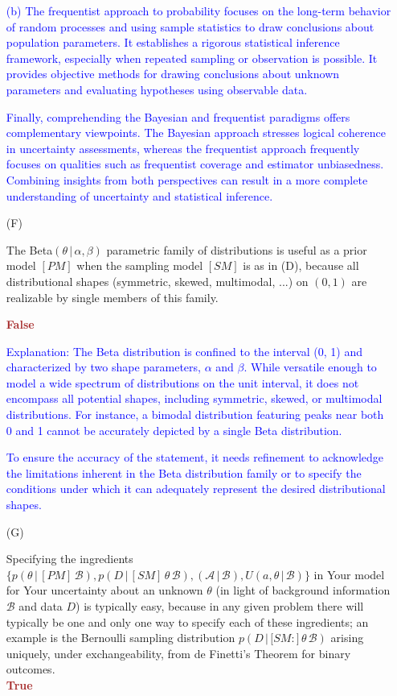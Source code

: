\documentclass[12pt]{article}
\newcommand{\given}{\, | \,}
\begin{document}
\begin{itemize}
\textcolor{blue}{(b) The frequentist approach to probability focuses on the long-term behavior of random processes and using sample statistics to draw conclusions about population parameters. It establishes a rigorous statistical inference framework, especially when repeated sampling or observation is possible. It provides objective methods for drawing conclusions about unknown parameters and evaluating hypotheses using observable data.}

\textcolor{blue}{Finally, comprehending the Bayesian and frequentist paradigms offers complementary viewpoints. The Bayesian approach stresses logical coherence in uncertainty assessments, whereas the frequentist approach frequently focuses on qualities such as frequentist coverage and estimator unbiasedness. Combining insights from both perspectives can result in a more complete understanding of uncertainty and statistical inference.}




\item[(F)]

The Beta$( \theta \given \alpha, \beta )$ parametric family of distributions is
useful as a prior model $[ PM ]$ when the sampling model $[ SM ]$ is as in
(D), because all distributional shapes (symmetric, skewed, multimodal, ...)
on $( 0, 1 )$ are realizable by single members of this family.

\textcolor{brown}{\textbf{False}}

\textcolor{blue}{Explanation:}
\textcolor{blue}{The Beta distribution is confined to the interval (0, 1) and characterized by two shape parameters, $\alpha$ and $\beta$. While versatile enough to model a wide spectrum of distributions on the unit interval, it does not encompass all potential shapes, including symmetric, skewed, or multimodal distributions. For instance, a bimodal distribution featuring peaks near both 0 and 1 cannot be accurately depicted by a single Beta distribution.}

\textcolor{blue}{To ensure the accuracy of the statement, it needs refinement to acknowledge the limitations inherent in the Beta distribution family or to specify the conditions under which it can adequately represent the desired distributional shapes.}


\item[(G)]

Specifying the ingredients $\{ p ( \theta \given [ PM ] \, \mathcal { B } ), p ( D \given
[ SM ] \, \theta \, { \mathcal B } ), ( { \mathcal A \given { \mathcal B } } ), U ( a, \theta \given { \mathcal B } ) \}$ in Your model for Your uncertainty about an unknown $\theta$ (in light of background information $\mathcal B$ and data $D$) is typically easy, because in any given problem there will typically be one and only one way to specify each of these ingredients; an example is the Bernoulli sampling distribution $p ( D \given [ SM \! : \mathbb ] \, \theta \, { \mathcal B } )$ arising uniquely, under exchangeability, from de Finetti's Theorem for binary outcomes. \\ \textcolor{brown}{\textbf{True}}


\end{itemize}
\end{document}

